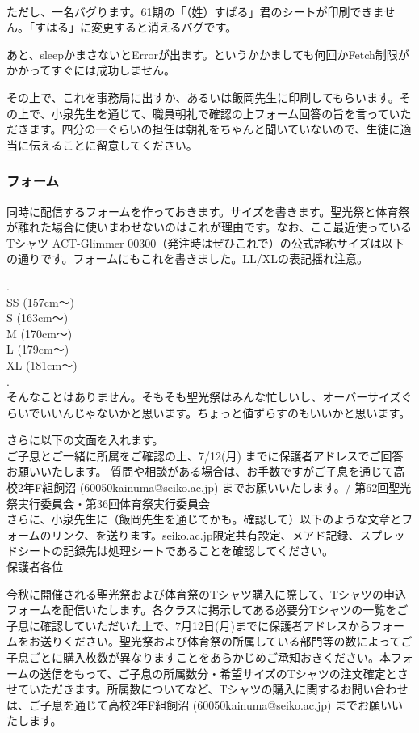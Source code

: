 \documentclass[dvipdfmx,jb5]{jreport}
\begin{document}
\\
ただし、一名バグります。61期の「（姓）すばる」君のシートが印刷できません。「すはる」に変更すると消えるバグです。

あと、sleepかまさないとErrorが出ます。というかかましても何回かFetch制限がかかってすぐには成功しません。

その上で、これを事務局に出すか、あるいは飯岡先生に印刷してもらいます。その上で、小泉先生を通じて、職員朝礼で確認の上フォーム回答の旨を言っていただきます。四分の一ぐらいの担任は朝礼をちゃんと聞いていないので、生徒に適当に伝えることに留意してください。
\\
\subsubsection{フォーム}
同時に配信するフォームを作っておきます。サイズを書きます。聖光祭と体育祭が離れた場合に使いまわせないのはこれが理由です。なお、ここ最近使っているTシャツ ACT-Glimmer 00300（発注時はぜひこれで）の公式詐称サイズは以下の通りです。フォームにもこれを書きました。LL/XLの表記揺れ注意。

.\\
SS (157cm〜)\\
S (163cm〜)\\
M (170cm〜)\\
L (179cm〜)\\
XL (181cm〜)\\
.
\\

そんなことはありません。そもそも聖光祭はみんな忙しいし、オーバーサイズぐらいでいいんじゃないかと思います。ちょっと値ずらすのもいいかと思います。

さらに以下の文面を入れます。
\\

ご子息とご一緒に所属をご確認の上、7/12(月) までに保護者アドレスでご回答お願いいたします。
質問や相談がある場合は、お手数ですがご子息を通じて高校2年F組飼沼 (60050kainuma@seiko.ac.jp) までお願いいたします。/ 第62回聖光祭実行委員会・第36回体育祭実行委員会\\

さらに、小泉先生に（飯岡先生を通じてかも。確認して）以下のような文章とフォームのリンク、を送ります。seiko.ac.jp限定共有設定、メアド記録、スプレッドシートの記録先は処理シートであることを確認してください。\\

保護者各位

今秋に開催される聖光祭および体育祭のTシャツ購入に際して、Tシャツの申込フォームを配信いたします。各クラスに掲示してある必要分Tシャツの一覧をご子息に確認していただいた上で、7月12日(月)までに保護者アドレスからフォームをお送りください。聖光祭および体育祭の所属している部門等の数によってご子息ごとに購入枚数が異なりますことをあらかじめご承知おきください。本フォームの送信をもって、ご子息の所属数分・希望サイズのTシャツの注文確定とさせていただきます。所属数についてなど、Tシャツの購入に関するお問い合わせは、ご子息を通じて高校2年F組飼沼 (60050kainuma@seiko.ac.jp) までお願いいたします。
\end{document}

